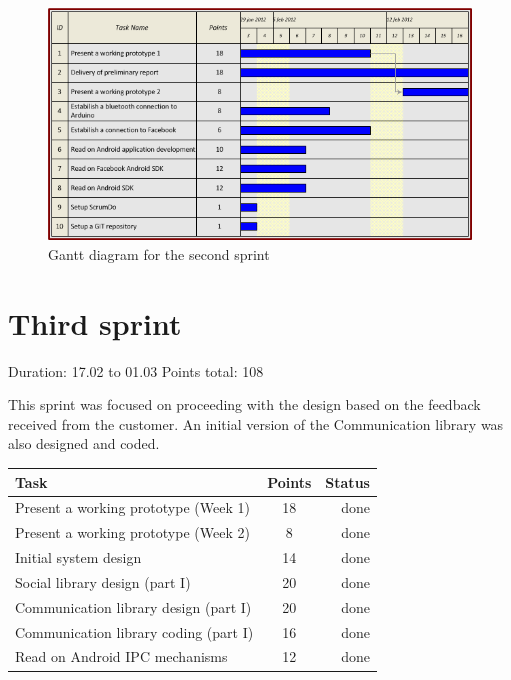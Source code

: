 \begin{figure}[h!]
\centering \includegraphics[scale=0.8]{img/sprints-gantt2.png}
\caption{Gantt diagram for the second sprint}
\label{fig:sprints-gantt2}
\end{figure}

\newpage


\section{Third sprint}

Duration: 17.02 to 01.03
Points total: 108

This sprint was focused on proceeding with the design based on the
feedback received from the customer. An initial version of the Communication
library was also designed and coded.

\begin{table}[ht!]
\begin{tabular}{ | l | c | r | }

\hline
\textbf{Task} & \textbf{Points} & \textbf{Status} \\
\hline

Present a working prototype (Week 1)		& 18 & done \\
\hline
Present a working prototype (Week 2)		& 8  & done \\
\hline
Initial system design						& 14 & done \\
\hline
Social library design (part I)				& 20 & done \\
\hline
Communication library design (part I)		& 20 & done \\
\hline
Communication library coding (part I) 		& 16 & done \\
\hline
Read on Android IPC mechanisms				& 12 & done \\
\hline

\end{tabular}
\end{table}

